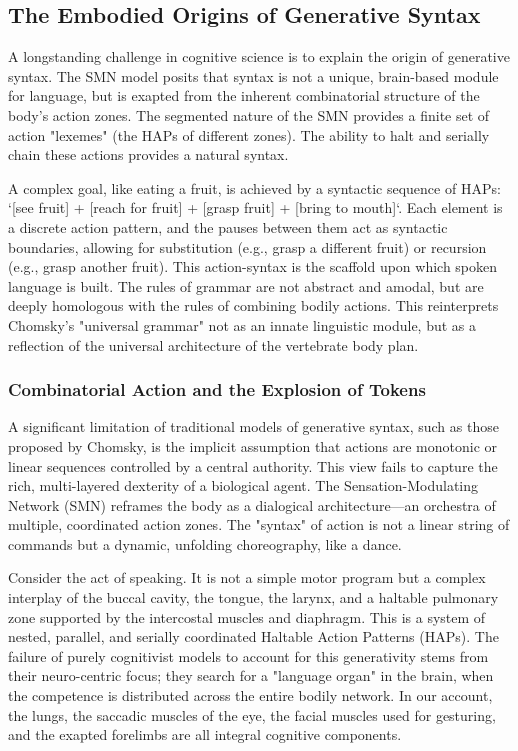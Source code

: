 \subsection*{The Embodied Origins of Generative Syntax}
A longstanding challenge in cognitive science is to explain the origin of generative syntax. The SMN model posits that syntax is not a unique, brain-based module for language, but is exapted from the inherent combinatorial structure of the body's action zones. The segmented nature of the SMN provides a finite set of action "lexemes" (the HAPs of different zones). The ability to halt and serially chain these actions provides a natural syntax. 

A complex goal, like eating a fruit, is achieved by a syntactic sequence of HAPs: `[see fruit] + [reach for fruit] + [grasp fruit] + [bring to mouth]`. Each element is a discrete action pattern, and the pauses between them act as syntactic boundaries, allowing for substitution (e.g., grasp a different fruit) or recursion (e.g., grasp another fruit). This action-syntax is the scaffold upon which spoken language is built. The rules of grammar are not abstract and amodal, but are deeply homologous with the rules of combining bodily actions. This reinterprets Chomsky's "universal grammar" not as an innate linguistic module, but as a reflection of the universal architecture of the vertebrate body plan.

\subsubsection*{Combinatorial Action and the Explosion of Tokens}
A significant limitation of traditional models of generative syntax, such as those proposed by Chomsky, is the implicit assumption that actions are monotonic or linear sequences controlled by a central authority. This view fails to capture the rich, multi-layered dexterity of a biological agent. The Sensation-Modulating Network (SMN) reframes the body as a dialogical architecture—an orchestra of multiple, coordinated action zones. The "syntax" of action is not a linear string of commands but a dynamic, unfolding choreography, like a dance.

Consider the act of speaking. It is not a simple motor program but a complex interplay of the buccal cavity, the tongue, the larynx, and a haltable pulmonary zone supported by the intercostal muscles and diaphragm. This is a system of nested, parallel, and serially coordinated Haltable Action Patterns (HAPs). The failure of purely cognitivist models to account for this generativity stems from their neuro-centric focus; they search for a "language organ" in the brain, when the competence is distributed across the entire bodily network. In our account, the lungs, the saccadic muscles of the eye, the facial muscles used for gesturing, and the exapted forelimbs are all integral cognitive components.

